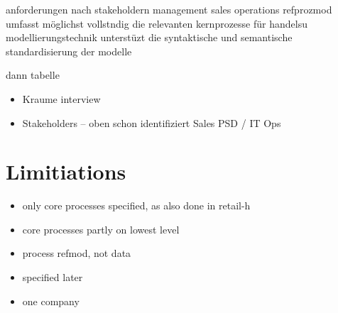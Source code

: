 anforderungen nach stakeholdern
management
sales
operations
refprozmod umfasst möglichst vollstndig die relevanten kernprozesse für handelsu
modellierungstechnik unterstüzt die syntaktische und semantische standardisierung der modelle

dann tabelle


\begin{itemize}
	\item Kraume interview
	\item Stakeholders -- oben schon identifiziert
	\subitem Sales
	\subitem PSD / IT
	\subitem Ops
\end{itemize}
\section{Limitiations}
\begin{itemize}
	\item only core processes specified, as also done in retail-h
	\item core processes partly on lowest level
	\item process refmod, not data
	\item specified later
		\item one company
\end{itemize}


